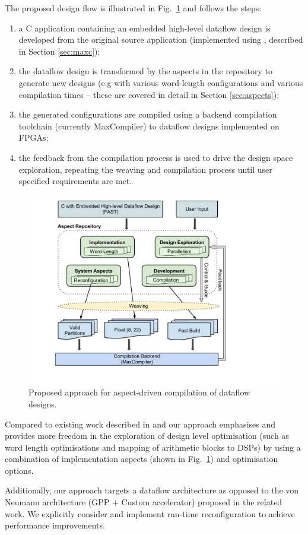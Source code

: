 The proposed design flow is illustrated in Fig.~\ref{fig:design-flow}
and follows the steps:
\begin{enumerate}
\item a C application containing an embedded high-level dataflow
  design is developed from the original source application
  (implemented using \MAXC{}, described in Section \ref{sec:maxc});
\item the dataflow design is transformed by the aspects in the
  repository to generate new designs (e.g with various word-length
  configurations and various compilation times -- these are covered in
  detail in Section \ref{sec:aspects});
\item the generated configurations are compiled using a backend
  compilation toolchain (currently MaxCompiler) to dataflow designs
  implemented on FPGAs;
\item the feedback from the compilation process is used to drive the
  design space exploration, repeating the weaving and compilation
  process until user specified requirements are met.
\end{enumerate}

\begin{figure}[!h]
  \includegraphics[scale=0.5, trim=60 50 0 0]{figs/design-flow}
  \caption{Proposed approach for aspect-driven compilation of dataflow
    designs.}
  \label{fig:design-flow}
\end{figure}

Compared to existing work described in
\cite{Cardoso:Teixeira:Alves:Nobre:Diniz:Cutinho:Luk:2012} and
\cite{cardoso2011new} our approach emphasises and provides more
freedom in the exploration of design level optimisation (such as word
length optimisations and mapping of arithmetic blocks to DSPs) by
using a combination of implementation aspects (shown in
Fig.~\ref{fig:design-flow}) and \MAXC{} optimisation options.

Additionally, our approach targets a dataflow architecture as opposed
to the von Neumann architecture (GPP + Custom accelerator) proposed in
the related work. We explicitly consider and implement run-time
reconfiguration to achieve performance improvements.
